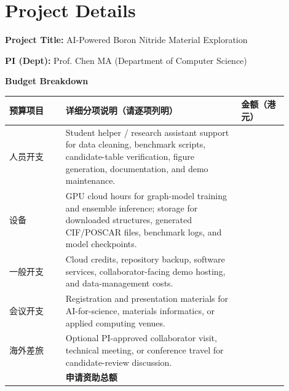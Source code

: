 \documentclass[10pt,a4paper]{article}
\newcommand{\blank}[1][7em]{\colorbox{yellow!35}{\rule{0pt}{1.05em}\hspace{#1}}}
\begin{document}
\clearpage
\section*{Project Details}
\textbf{Project Title:} AI-Powered Boron Nitride Material Exploration

\textbf{PI (Dept):} Prof. Chen MA (Department of Computer Science)

\textbf{Budget Breakdown}
\begin{center}
\small
\begin{tabular}{>{\raggedright\arraybackslash}p{0.18\linewidth}>{\raggedright\arraybackslash}p{0.57\linewidth}>{\raggedright\arraybackslash}p{0.15\linewidth}}
\toprule
\textbf{预算项目} &
\textbf{详细分项说明（请逐项列明）} &
\textbf{金额（港元）}\\
\midrule
人员开支 & Student helper / research assistant support for data cleaning, benchmark scripts, candidate-table verification, figure generation, documentation, and demo maintenance. & \blank\\
设备 & GPU cloud hours for graph-model training and ensemble inference; storage for downloaded structures, generated CIF/POSCAR files, benchmark logs, and model checkpoints. & \blank\\
一般开支 & Cloud credits, repository backup, software services, collaborator-facing demo hosting, and data-management costs. & \blank\\
会议开支 & Registration and presentation materials for AI-for-science, materials informatics, or applied computing venues. & \blank\\
海外差旅 & Optional PI-approved collaborator visit, technical meeting, or conference travel for candidate-review discussion. & \blank\\
\midrule
 & \textbf{申请资助总额} & \blank\\
\bottomrule
\end{tabular}
\end{center}
\end{document}
